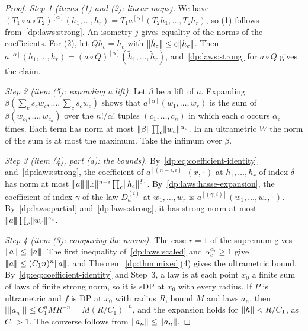 \begin{proof}
\emph{Step 1 (items (1) and (2): linear maps).} We have $(T_1\circ a\circ T_2)^{[\alpha]}(h_1,\dots,h_r)=T_1a^{[\alpha]}(T_2h_1,\dots,T_2h_r)$, so (1) follows from~\eqref{dp:laws:strong}. An isometry $j$ gives equality of the norms of the coefficients. For (2), let $Q\tilde h_c=h_c$ with $\lVert \tilde h_c\rVert\le\mathsf c\lVert h_c\rVert$. Then $a^{[\alpha]}(h_1,\dots,h_r)=(a\circ Q)^{[\alpha]}(\tilde h_1,\dots,\tilde h_r)$, and~\eqref{dp:laws:strong} for $a\circ Q$ gives the claim.

\emph{Step 2 (item (5): expanding a lift).} Let $\beta$ be a lift of $a$. Expanding $\beta(\sum_cs_cw_c,\dots,\sum_cs_cw_c)$ shows that $a^{[\alpha]}(w_1,\dots,w_r)$ is the sum of $\beta(w_{c_1},\dots,w_{c_n})$ over the $n!/\alpha!$ tuples $(c_1,\dots,c_n)$ in which each $c$ occurs $\alpha_c$ times. Each term has norm at most $\lVert \beta\rVert\prod_c\lVert w_c\rVert^{\alpha_c}$. In an ultrametric $W$ the norm of the sum is at most the maximum. Take the infimum over $\beta$.

\emph{Step 3 (item (4), part (a): the bounds).} By~\eqref{dp:eq:coefficient-identity} and~\eqref{dp:laws:strong}, the coefficient of $a^{[(n-i,i)]}(x,\cdot\,)$ at $h_1,\dots,h_r$ of index $\delta$ has norm at most $\lvert\!\lvert\!\lvert a\rvert\!\rvert\!\rvert\,\lVert x\rVert^{n-i}\prod_c\lVert h_c\rVert^{\delta_c}$. By~\eqref{dp:laws:hasse-expansion}, the coefficient of index $\gamma$ of the law $D^{(i)}_a$ at $w_1,\dots,w_r$ is $a^{[(\gamma,i)]}(w_1,\dots,w_r,\cdot\,)$. By~\eqref{dp:laws:partial} and~\eqref{dp:laws:strong}, it has strong norm at most $\lvert\!\lvert\!\lvert a\rvert\!\rvert\!\rvert\prod_c\lVert w_c\rVert^{\gamma_c}$.

\emph{Step 4 (item (3): comparing the norms).} The case $r=1$ of the supremum gives $\lVert a\rVert\le\lvert\!\lvert\!\lvert a\rvert\!\rvert\!\rvert$. The first inequality of~\eqref{dp:laws:scaled} and $\alpha_c^{\alpha_c}\ge1$ give $\lvert\!\lvert\!\lvert a\rvert\!\rvert\!\rvert\le(C_1n)^n\lVert a\rVert$, and Theorem~\ref{dp:thm:mixed}(4) gives the ultrametric bound. By~\eqref{dp:eq:coefficient-identity} and Step~3, a law is at each point $x_0$ a finite sum of laws of finite strong norm, so it is sDP at $x_0$ with every radius. If $P$ is ultrametric and $f$ is DP at $x_0$ with radius $R$, bound $M$ and laws $a_n$, then $\lvert\!\lvert\!\lvert a_n\rvert\!\rvert\!\rvert\le C_1^nMR^{-n}=M(R/C_1)^{-n}$, and the expansion holds for $\lVert h\rVert<R/C_1$, as $C_1>1$. The converse follows from $\lVert a_n\rVert\le\lvert\!\lvert\!\lvert a_n\rvert\!\rvert\!\rvert$.


\end{proof}

